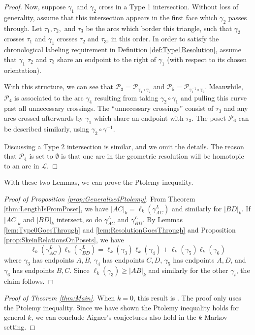 \documentclass[12pt, letterpaper,table]{amsart}
\theoremstyle{remark}
\newcommand{\calP}{\mathcal{P}}
\begin{document}
\begin{proof}
Now, suppose $\gamma_1$ and $\gamma_2$ cross in a Type 1 intersection. Without loss of generality, assume that this intersection appears in the first face which $\gamma_2$ passes through. Let $\tau_1,\tau_2,$ and $\tau_3$ be the arcs which border this triangle, such that $\gamma_2$ crosses $\tau_1$ and $\gamma_1$ crosses $\tau_2$ and $\tau_3$, in this order. In order to satisfy the chronological labeling requirement in Definition \ref{def:Type1Resolution}, assume that $\gamma_1$ $\tau_2$ and $\tau_3$ share an endpoint to the right of $\gamma_1$ (with respect to its chosen orientation).

With this structure, we can see that $\calP_3 =\calP_{\gamma_1 \circ \gamma_2}$ and $\calP_5 = \calP_{\gamma_1^{-1} \circ \gamma_2}$. Meanwhile, $\calP_4$ is associated to the arc $\gamma_4$ resulting from taking $\gamma_2 \circ \gamma_1$ and pulling this curve past all unnecessary crossings. The ``unnecessary crossings'' consist of $\tau_3$ and any arcs crossed afterwards by $\gamma_1$ which share an endpoint with $\tau_3$. The poset $\calP_6$ can be described similarly, using $\gamma_2 \circ \gamma^{-1}$.

Discussing a Type 2 intersection is similar, and we omit the details. The reason that $\calP_4$ is set to $\emptyset$ is that one arc in the geometric resolution will be homotopic to an arc in $\mathcal{L}$.
\end{proof}

With these two Lemmas, we can prove the Ptolemy inequality.

\begin{proof}[Proof of Proposition \ref{prop:GeneralizedPtolemy}]
From Theorem \ref{thm:LengthIsFromPoset}, we have $\vert AC \vert_k = \ell_k(\gamma_{AC}^L)$ and similarly for $\vert BD \vert_k$. If $\vert AC \vert_k$ and $\vert BD \vert_k$ intersect, so do $\gamma_{AC}^L$ and $\gamma_{BD}^L$. By Lemmas \ref{lem:Type0GoesThrough} and \ref{lem:ResolutionGoesThrough} and Proposition \ref{prop:SkeinRelationsOnPosets}, we have \[
\ell_k(\gamma_{AC}^L) \ell_k(\gamma_{BD}^L) = \ell_k(\gamma_3)\ell_k(\gamma_4) + \ell_k(\gamma_5)\ell_k(\gamma_6)
\]
where $\gamma_3$ has endpoints $A,B$, $\gamma_4$ has endpoints $C,D$, $\gamma_5$ has endpoints $A,D$, and $\gamma_6$ has endpoints $B,C$. Since $\ell_k(\gamma_3) \geq \vert AB \vert_k$ and similarly for the other $\gamma_i$, the claim follows. 
\end{proof}



\begin{proof}[Proof of Theorem \ref{thm:Main}]
When $k =0$, this result is \cite[Theorem 4.1]{LLRS}. The proof only uses the Ptolemy inequality. Since we have shown the Ptolemy inequality holds for general $k$, we can conclude Aigner's conjectures also hold in the $k$-Markov setting. 
\end{proof}
\end{document}
